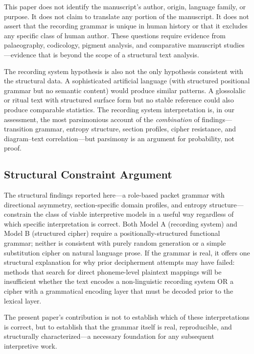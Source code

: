 \documentclass[11pt,a4paper,twocolumn]{article}
\begin{document}
This paper does not identify the manuscript's author, origin, language family, or purpose. It does not claim to translate any portion of the manuscript. It does not assert that the recording grammar is unique in human history or that it excludes any specific class of human author. These questions require evidence from palaeography, codicology, pigment analysis, and comparative manuscript studies---evidence that is beyond the scope of a structural text analysis.

The recording system hypothesis is also not the only hypothesis consistent with the structural data. A sophisticated artificial language (with structured positional grammar but no semantic content) would produce similar patterns. A glossolalic or ritual text with structured surface form but no stable reference could also produce comparable statistics. The recording system interpretation is, in our assessment, the most parsimonious account of the \textit{combination} of findings---transition grammar, entropy structure, section profiles, cipher resistance, and diagram--text correlation---but parsimony is an argument for probability, not proof.

\subsection{Structural Constraint Argument}

The structural findings reported here---a role-based packet grammar with directional asymmetry, section-specific domain profiles, and entropy structure---constrain the class of viable interpretive models in a useful way regardless of which specific interpretation is correct. Both Model A (recording system) and Model B (structured cipher) require a positionally-structured functional grammar; neither is consistent with purely random generation or a simple substitution cipher on natural language prose. If the grammar is real, it offers one structural explanation for why prior decipherment attempts may have failed: methods that search for direct phoneme-level plaintext mappings will be insufficient whether the text encodes a non-linguistic recording system OR a cipher with a grammatical encoding layer that must be decoded prior to the lexical layer.

The present paper's contribution is not to establish which of these interpretations is correct, but to establish that the grammar itself is real, reproducible, and structurally characterized---a necessary foundation for any subsequent interpretive work.
\end{document}
